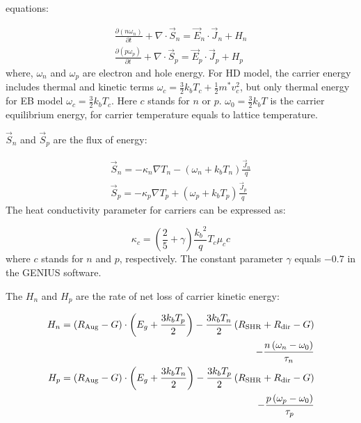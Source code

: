 \documentclass[oneside,12pt]{cgd_book}
\begin{document}
        equations:
\par
\par
\begin{subequations}
\begin{align}
 \frac{\partial \left( {n\omega _n } \right)} {\partial t} + \nabla \cdot \vec{S}_n  = \vec{E}_n \cdot
        \vec{J}_n +H_n \\
 \frac{\partial \left( {p\omega _p } \right)} {\partial t} + \nabla \cdot \vec{S}_p = \vec{E}_p \cdot
        \vec{J}_p +H_p
\end{align}
\end{subequations}
where, $\omega _n$ and $\omega _p$ are electron and
      hole energy. For HD model, the carrier energy includes thermal and kinetic terms
$\omega _c =
      \frac{3}{2}k_bT_c + \frac{1}{2}m^* v_c^2$, but only thermal energy for EB model
$\omega _c = \frac{3}{2}k_bT_c$. Here $c$ stands for $n$ or $p$.
$\omega_0=\frac{3}{2}k_bT$ is the carrier equilibrium energy, for carrier temperature equals to lattice temperature.
\par
$\vec{S}_n$ and $\vec{S}_p$ are the flux of
      energy:
\par
\begin{subequations}
\begin{align}
 \vec{S}_n  = - \kappa _n \nabla T_n - \left( \omega_n + k_b T_n \right) \frac{\vec{J}_n} {q}  \\
 \vec{S}_p  = - \kappa _p \nabla T_p + \left( \omega_p + k_b T_p \right) \frac{\vec{J}_p} {q}
\end{align}
\end{subequations}
The heat conductivity parameter for carriers can be expressed as:
\par
\begin{equation}
\kappa_c=(\frac{2}{5}+\gamma)\frac{{k_b}^2}{q}T_c\mu_cc
\end{equation}
where $c$ stands for $n$ and $p$, respectively. The constant parameter
$\gamma$ equals $-0.7$ in the GENIUS software.
\par
The $H_n$ and $H_p$ are the rate of net loss of
      carrier kinetic energy:
\par
\begin{subequations}
\begin{align}
 H_n =  \left( R_{\rm Aug} - G \right) \cdot \left( E_g + \frac{3k_b T_p } {2} \right) -
        \frac{3k_b T_n } {2}\left( R_{\rm SHR} + R_{\rm dir} - G \right) \\
  -\frac{{n\left( {\omega _n - \omega _0 } \right)}}{{\tau _n }} \\
 H_p =  \left( R_{\rm Aug} - G \right) \cdot \left( E_g + \frac{3k_b T_n } {2} \right) -
        \frac{3k_b T_p}{2}\left( R_{\rm SHR} + R_{\rm dir} - G \right) \\
  - \frac{p\left( \omega _p - \omega _0 \right)}{\tau _p }
\end{align}
\end{subequations}
\end{document}

